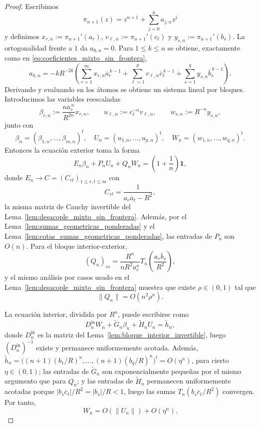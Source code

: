 \begin{proof}
	Escribimos
	\[
		\pi_{n+1}(z)=z^{n+1}+\sum_{j=0}^n a_{j,n}z^j
	\]
	y definimos $x_{r,n}:=\pi_{n+1}'(a_r)$, $v_{\ell,n}:=\pi_{n+1}'(c_\ell)$ y $y_{s,n}:=\pi_{n+1}'(b_s)$.
	La ortogonalidad frente a $1$ da $a_{0,n}=0$. Para $1\le k\le n$ se obtiene, exactamente como en \eqref{eq:coeficientes_mixto_sin_frontera},
	\[
		a_{k,n}=-kR^{-2k}\left(\sum_{r=1}^m x_{r,n}\overline a_r^{\,k-1}+\sum_{\ell=1}^p v_{\ell,n}\overline c_\ell^{\,k-1}+\sum_{s=1}^q y_{s,n}\overline b_s^{\,k-1}\right).
	\]
	Derivando y evaluando en los átomos se obtiene un sistema lineal por bloques. Introducimos las variables reescaladas
	\[
		\beta_{r,n}:=\frac{n\overline a_r^{\,n}}{R^{2n}}x_{r,n},
		\qquad
		u_{\ell,n}:=c_\ell^{-n}v_{\ell,n},
		\qquad
		w_{s,n}:=R^{-n}y_{s,n},
	\]
	junto con
	\[
		\beta_n=(\beta_{1,n},\dots,\beta_{m,n})^t,
		\quad
		U_n=(u_{1,n},\dots,u_{p,n})^t,
		\quad
		W_n=(w_{1,n},\dots,w_{q,n})^t.
	\]
	Entonces la ecuación exterior toma la forma
	\begin{equation}\label{eq:outer_mixed_boundary}
		E_n\beta_n+P_nU_n+Q_nW_n=\left(1+\frac1n\right)\mathbf 1,
	\end{equation}
	donde $E_n\to C=(C_{rt})_{1\le r,t\le m}$ con
	\[
		C_{rt}=\frac{1}{a_r\overline a_t-R^2},
	\]
	la misma matriz de Cauchy invertible del Lema~\ref{lem:desacople_mixto_sin_frontera}. Además, por el Lema~\ref{lem:sumas_geometricas_ponderadas} y el Lema~\ref{lem:cotas_sumas_geometricas_ponderadas}, las entradas de $P_n$ son $O(n)$. Para el bloque interior-exterior,
	\[
		(Q_n)_{rs}=\frac{R^n}{nR^2a_r^n}
		T_n\!\left(\frac{a_r\overline b_s}{R^2}\right),
	\]
	y el mismo análisis por casos usado en el Lema~\ref{lem:desacople_mixto_sin_frontera} muestra que existe $\rho\in(0,1)$ tal que
	\[
		\|Q_n\|=O(n^2\rho^n).
	\]

	La ecuación interior, dividida por $R^n$, puede escribirse como
	\begin{equation}\label{eq:inner_mixed_boundary}
		D_n^{\mathrm{in}}W_n+\widetilde G_n\beta_n+\widetilde H_nU_n=\widetilde h_n,
	\end{equation}
	donde $D_n^{\mathrm{in}}$ es la matriz del Lema~\ref{lem:bloque_interior_invertible}, luego $(D_n^{\mathrm{in}})^{-1}$ existe y permanece uniformemente acotada. Además, $\widetilde h_n=\bigl((n+1)(b_1/R)^n,\dots,(n+1)(b_q/R)^n\bigr)^t=O(\eta^n)$,
	para cierto $\eta\in(0,1)$; las entradas de $\widetilde G_n$ son exponencialmente pequeñas por el mismo argumento que para $Q_n$; y las entradas de $\widetilde H_n$ permanecen uniformemente acotadas porque $|b_s\overline c_\ell|/R^2=|b_s|/R<1$, luego las sumas $T_n(b_s\overline c_\ell/R^2)$ convergen. Por tanto,
	\begin{equation}\label{eq:Y_small_mixed_boundary}
		W_n=O(\|U_n\|)+O(\eta^n).
	\end{equation}


\end{proof}
